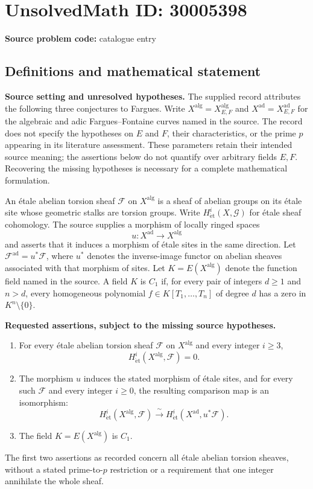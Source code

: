 \documentclass[11pt]{article}
\begin{document}
\section*{UnsolvedMath ID: 30005398}
\textbf{Source problem code:} catalogue entry
\subsection{Definitions and mathematical statement}
\textbf{Source setting and unresolved hypotheses.} The supplied record attributes the following three conjectures to Fargues. Write \(X^{\mathrm{alg}}=X_{E,F}^{\mathrm{alg}}\) and \(X^{\mathrm{ad}}=X_{E,F}^{\mathrm{ad}}\) for the algebraic and adic Fargues--Fontaine curves named in the source. The record does not specify the hypotheses on \(E\) and \(F\), their characteristics, or the prime \(p\) appearing in its literature assessment. These parameters retain their intended source meaning; the assertions below do not quantify over arbitrary fields \(E,F\). Recovering the missing hypotheses is necessary for a complete mathematical formulation.

An étale abelian torsion sheaf \(\mathcal F\) on \(X^{\mathrm{alg}}\) is a sheaf of abelian groups on its étale site whose geometric stalks are torsion groups. Write \(H^i_{\mathrm{\acute et}}(X,\mathcal G)\) for étale sheaf cohomology. The source supplies a morphism of locally ringed spaces
\[
u:X^{\mathrm{ad}}\longrightarrow X^{\mathrm{alg}}
\]
and asserts that it induces a morphism of étale sites in the same direction. Let \(\mathcal F^{\mathrm{ad}}=u^*\mathcal F\), where \(u^*\) denotes the inverse-image functor on abelian sheaves associated with that morphism of sites. Let \(K=E(X^{\mathrm{alg}})\) denote the function field named in the source. A field \(K\) is \(C_1\) if, for every pair of integers \(d\geq 1\) and \(n>d\), every homogeneous polynomial \(f\in K[T_1,\ldots,T_n]\) of degree \(d\) has a zero in \(K^n\setminus\{0\}\).

\textbf{Requested assertions, subject to the missing source hypotheses.}
\begin{enumerate}
\item For every étale abelian torsion sheaf \(\mathcal F\) on \(X^{\mathrm{alg}}\) and every integer \(i\geq 3\),
\[
H^i_{\mathrm{\acute et}}(X^{\mathrm{alg}},\mathcal F)=0.
\]
\item The morphism \(u\) induces the stated morphism of étale sites, and for every such \(\mathcal F\) and every integer \(i\geq 0\), the resulting comparison map is an isomorphism:
\[
H^i_{\mathrm{\acute et}}(X^{\mathrm{alg}},\mathcal F)
\xrightarrow{\ \sim\ }
H^i_{\mathrm{\acute et}}(X^{\mathrm{ad}},u^*\mathcal F).
\]
\item The field \(K=E(X^{\mathrm{alg}})\) is \(C_1\).
\end{enumerate}
The first two assertions as recorded concern all étale abelian torsion sheaves, without a stated prime-to-\(p\) restriction or a requirement that one integer annihilate the whole sheaf.
\end{document}
